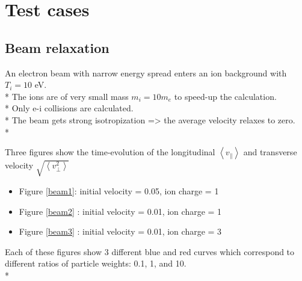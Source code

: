 \documentclass[11pt]{article}
\begin{document}
 
\clearpage

\section{Test cases}

\subsection{Beam relaxation}

An electron beam with narrow energy spread enters an ion background with $T_i=10$ eV.\\*
The ions are of very small mass $m_i=10 m_e$ to speed-up the calculation.\\*
Only e-i collisions are calculated.\\*
The beam gets strong isotropization => the average velocity relaxes to zero.\\*

Three figures show the time-evolution of the longitudinal $\left<v_\|\right>$ and transverse velocity $\sqrt{\left<v_\perp^2\right>}$
\begin{itemize}
\item Figure \ref{beam1}: initial velocity = 0.05, ion charge = 1
\item Figure \ref{beam2} : initial velocity = 0.01, ion charge = 1
\item Figure \ref{beam3} : initial velocity = 0.01, ion charge = 3
\end{itemize}
Each of these figures show 3 different blue and red curves which correspond to different ratios of particle weights: 0.1, 1, and 10.\\*
\end{document}
